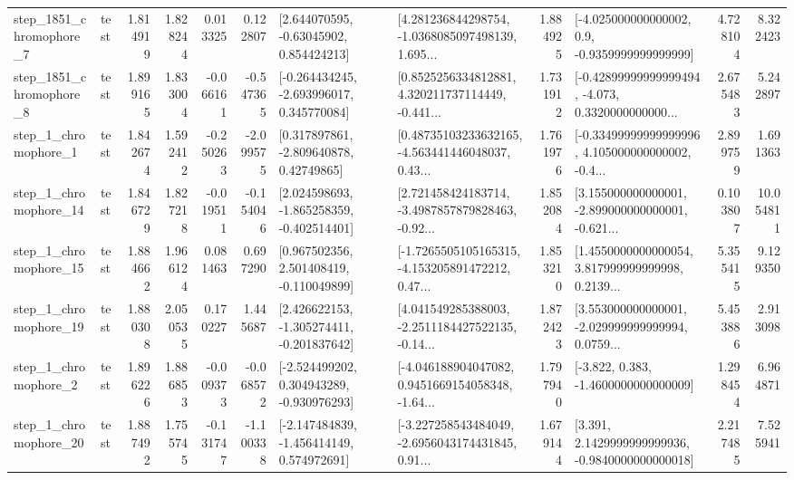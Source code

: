 \begin{tabular}{llrrrrllrlrr}
  step\_1851\_chromophore\_7 &      test &      1.814919 &    1.828244 &      0.013325 &  0.122807 &     [2.644070595, -0.63045902, 0.854424213] &  [4.281236844298754, -1.0368085097498139, 1.695... &       1.884925 &     [-4.025000000000002, 0.9, -0.9359999999999999] &            4.728104 &          8.322423 \\
  step\_1851\_chromophore\_8 &      test &      1.899165 &    1.833004 &     -0.066161 & -0.547365 &   [-0.264434245, -2.693996017, 0.345770084] &  [0.8525256334812881, 4.320211737114449, -0.441... &       1.731912 &  [-0.42899999999999494, -4.073, 0.3320000000000... &            2.675483 &          5.242897 \\
     step\_1\_chromophore\_1 &      test &      1.842674 &    1.592412 &     -0.250263 & -2.099575 &     [0.317897861, -2.809640878, 0.42749865] &  [0.48735103233632165, -4.563441446048037, 0.43... &       1.761976 &  [-0.33499999999999996, 4.105000000000002, -0.4... &            2.899759 &          1.691363 \\
    step\_1\_chromophore\_14 &      test &      1.846729 &    1.827218 &     -0.019511 & -0.154046 &   [2.024598693, -1.865258359, -0.402514401] &  [2.721458424183714, -3.4987857879828463, -0.92... &       1.852084 &  [3.155000000000001, -2.899000000000001, -0.621... &            0.103807 &         10.054811 \\
    step\_1\_chromophore\_15 &      test &      1.884662 &    1.966124 &      0.081463 &  0.697290 &    [0.967502356, 2.501408419, -0.110049899] &  [-1.7265505105165315, -4.153205891472212, 0.47... &       1.853210 &  [1.4550000000000054, 3.817999999999998, 0.2139... &            5.355415 &          9.129350 \\
    step\_1\_chromophore\_19 &      test &      1.880308 &    2.050535 &      0.170227 &  1.445687 &   [2.426622153, -1.305274411, -0.201837642] &  [4.041549285388003, -2.2511184427522135, -0.14... &       1.872423 &  [3.553000000000001, -2.029999999999994, 0.0759... &            5.453886 &          2.913098 \\
     step\_1\_chromophore\_2 &      test &      1.896226 &    1.886853 &     -0.009373 & -0.068572 &   [-2.524499202, 0.304943289, -0.930976293] &  [-4.046188904047082, 0.9451669154058348, -1.64... &       1.797940 &               [-3.822, 0.383, -1.4600000000000009] &            1.298454 &          6.964871 \\
    step\_1\_chromophore\_20 &      test &      1.887492 &    1.755745 &     -0.131747 & -1.100338 &   [-2.147484839, -1.456414149, 0.574972691] &  [-3.227258543484049, -2.6956043174431845, 0.91... &       1.679144 &   [3.391, 2.1429999999999936, -0.9840000000000018] &            2.217485 &          7.525941 \\

\end{tabular}
